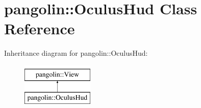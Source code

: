 \hypertarget{classpangolin_1_1_oculus_hud}{}\section{pangolin\+:\+:Oculus\+Hud Class Reference}
\label{classpangolin_1_1_oculus_hud}
Inheritance diagram for pangolin\+:\+:Oculus\+Hud\+:\begin{figure}[H]
\begin{center}
\leavevmode
\includegraphics[height=2.000000cm]{classpangolin_1_1_oculus_hud}
\end{center}
\end{figure}
